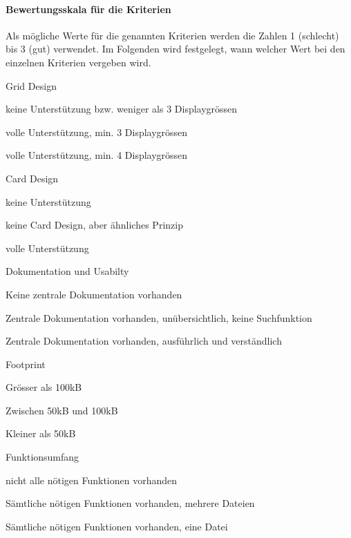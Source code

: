 \paragraph*{Bewertungsskala für die Kriterien}
Als mögliche Werte für die genannten Kriterien werden die Zahlen 1 (schlecht) bis 3 (gut) verwendet. Im Folgenden wird festgelegt, wann welcher Wert bei den einzelnen Kriterien vergeben wird.
\begin{itemize*}
\item Grid Design
  \begin{enumerate*}
  \item keine Unterstützung bzw. weniger als 3 Displaygrössen
  \item volle Unterstützung, min. 3 Displaygrössen
  \item volle Unterstützung, min. 4 Displaygrössen
  \end{enumerate*}
\item Card Design
  \begin{enumerate*}
  \item keine Unterstützung
  \item keine Card Design, aber ähnliches Prinzip
  \item volle Unterstützung
  \end{enumerate*}
\item Dokumentation und Usabilty
  \begin{enumerate*}
  \item Keine zentrale Dokumentation vorhanden
  \item Zentrale Dokumentation vorhanden, unübersichtlich, keine Suchfunktion
  \item Zentrale Dokumentation vorhanden, ausführlich und verständlich
  \end{enumerate*}
\item Footprint
  \begin{enumerate*}
  \item Grösser als 100kB
  \item Zwischen 50kB und 100kB
  \item Kleiner als 50kB
  \end{enumerate*}
\item Funktionsumfang
  \begin{enumerate*}
  \item nicht alle nötigen Funktionen vorhanden
  \item Sämtliche nötigen Funktionen vorhanden, mehrere Dateien
  \item Sämtliche nötigen Funktionen vorhanden, eine Datei
  \end{enumerate*}
\end{itemize*}


